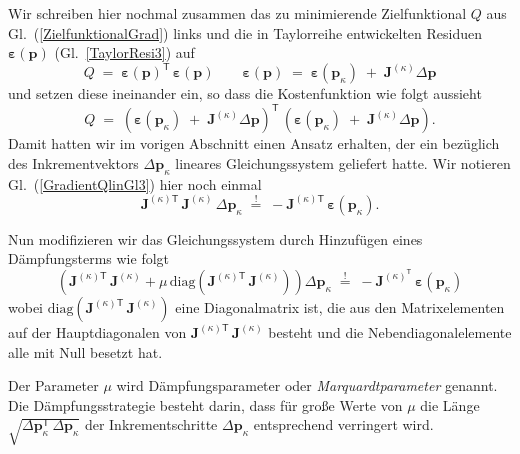 Wir schreiben hier nochmal zusammen das zu minimierende Zielfunktional $Q$ aus Gl.~(\ref{ZielfunktionalGrad}) links
und die in Taylorreihe entwickelten Residuen $\boldsymbol{\varepsilon}(\mathbf{p})$
(Gl.~\ref{TaylorResi3}) auf
$$
Q \; = \; \boldsymbol{\varepsilon}(\mathbf{p})^\mathsf{T} \, \boldsymbol{\varepsilon}(\mathbf{p})
\qquad
\boldsymbol{\varepsilon}(\mathbf{p})
\; = \; 
\boldsymbol{\varepsilon}(\mathbf{p}_\kappa)
\; + \; \boldsymbol{J}^{(\kappa)} \Delta \mathbf{p}
$$
und setzen diese ineinander ein, so dass die Kostenfunktion wie folgt aussieht
\begin{equation}
Q \; = \; \left( \boldsymbol{\varepsilon}(\mathbf{p}_\kappa)
\; + \; \boldsymbol{J}^{(\kappa)} \Delta \mathbf{p} \right)^\mathsf{T} \,
\left( \boldsymbol{\varepsilon}(\mathbf{p}_\kappa)
\; + \; \boldsymbol{J}^{(\kappa)} \Delta \mathbf{p} \right) .
\label{ZielfunktionalTaylorResi}
\end{equation}
Damit hatten wir im vorigen Abschnitt einen Ansatz erhalten, der
ein bezüglich des Inkrementvektors $\Delta \mathbf{p}_\kappa$ lineares Gleichungssystem
geliefert hatte. Wir notieren Gl.~(\ref{GradientQlinGl3}) hier noch einmal
\begin{equation*}
 \boldsymbol{J}^{(\kappa) \textsf{T}} \, \boldsymbol{J}^{(\kappa)} \, \Delta \mathbf{p}_\kappa
\; \overset{!}{=} \; 
-  \boldsymbol{J}^{(\kappa) \textsf{T}} \, \boldsymbol{\varepsilon}(\mathbf{p}_\kappa) .
\end{equation*}

Nun modifizieren wir das Gleichungssystem durch Hinzufügen eines Dämpfungsterms
wie folgt
\begin{equation}
\left(
\boldsymbol{J}^{(\kappa) \textsf{T}} \, \boldsymbol{J}^{(\kappa)}
 + \mu \, \mathrm{diag}\left(\boldsymbol{J}^{(\kappa) \textsf{T}} \, \boldsymbol{J}^{(\kappa)}\right)
 \right) \Delta \mathbf{p}_\kappa \;
\overset{!}{=} \; - \boldsymbol{J}^{(\kappa)^\textsf{T}} \, \boldsymbol{\varepsilon}(\mathbf{p}_\kappa)
\label{ZielfunktionalGradTaylorResiDaempf}
\end{equation}
wobei $\mathrm{diag}\left(\boldsymbol{J}^{(\kappa) \textsf{T}} \, \boldsymbol{J}^{(\kappa)}\right)$ 
eine Diagonalmatrix ist, die aus den Matrixelementen auf der Hauptdiagonalen von
$\boldsymbol{J}^{(\kappa) \textsf{T}} \, \boldsymbol{J}^{(\kappa)}$ besteht und die 
Nebendiagonalelemente alle mit Null besetzt hat.

Der Parameter $\mu$ wird Dämpfungsparameter oder \textsl{Marquardtparameter} genannt.
Die Dämpf\-ungs\-strategie besteht darin, dass für große Werte von $\mu$ die Länge
$\sqrt{\Delta \mathbf{p}_\kappa^\mathsf{T} \, \Delta \mathbf{p}_\kappa}$
der Inkrementschritte $\Delta \mathbf{p}_\kappa$ entsprechend verringert wird.


